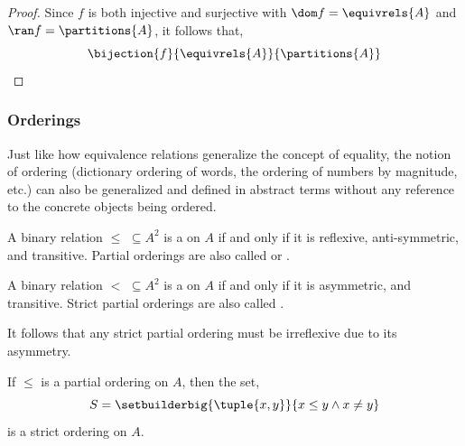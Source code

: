 \begin{proof}
    \vspace{0.3cm}
    \noindent
    Since \( f \) is both injective and surjective with \( \dom f = \equivrels{A} \) and \( \ran f = \partitions{A} \), it
    follows that,
    \begin{equation*}
        \bijection{f}{\equivrels{A}}{\partitions{A}} \qedhere
    \end{equation*}
\end{proof}

\subsubsection{Orderings} \label{ssec:order-relations}
Just like how equivalence relations generalize the concept of equality, the notion of ordering
(dictionary ordering of words, the ordering of numbers by magnitude, etc.) can also be generalized and defined in
abstract terms without any reference to the concrete objects being ordered.

\begin{dfn}
    \label{dfn:partial-ordering}
    A binary relation \( \leq \,\, \subseteq A^{2} \) is a  on \( A \)
    if and only if it is reflexive, anti-symmetric, and transitive. Partial orderings are also called
     or .
\end{dfn}

\begin{dfn}
    \label{dfn:strict-partial-ordering}
    A binary relation \( < \,\, \subseteq A^{2} \) is a 
    on \( A \) if and only if it is asymmetric, and transitive. Strict partial
    orderings are also called .
\end{dfn}

\begin{rem}
    It follows that any strict partial ordering must be irreflexive due to its asymmetry.
\end{rem}

\begin{lem}
    \label{lem:any-partial-ordering-corresponds-to-a-strict-partial-ordering}
    If \( \leq \) is a partial ordering on \( A \), then the set,
    \begin{equation*}
        S = \setbuilderbig{\tuple{x,y}}{x \leq y \land x \neq y}
    \end{equation*}
    is a strict ordering on \( A \).
\end{lem}

